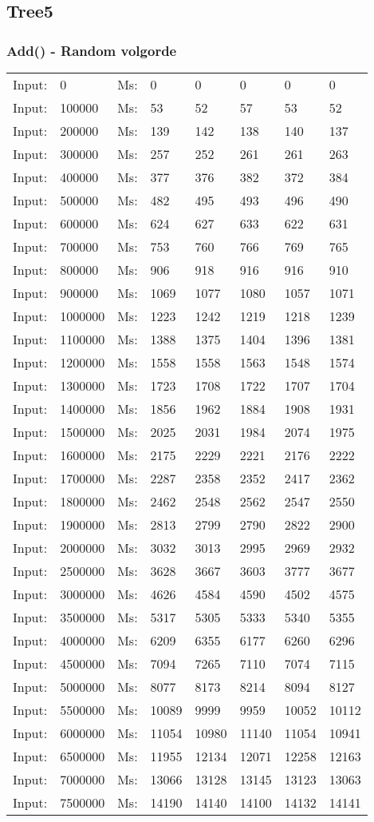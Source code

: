 \documentclass[11pt,a4paper]{report}
\begin{document}
\begin{tiny}
\subsection*{Tree5}
\subsubsection*{Add() - Random volgorde}
\begin{tabular}{l l ||l  l  l  l  l  l}
Input:&0&Ms:&0&0&0&0&0\\
Input:&100000&Ms:&53&52&57&53&52\\
Input:&200000&Ms:&139&142&138&140&137\\
Input:&300000&Ms:&257&252&261&261&263\\
Input:&400000&Ms:&377&376&382&372&384\\
Input:&500000&Ms:&482&495&493&496&490\\
Input:&600000&Ms:&624&627&633&622&631\\
Input:&700000&Ms:&753&760&766&769&765\\
Input:&800000&Ms:&906&918&916&916&910\\
Input:&900000&Ms:&1069&1077&1080&1057&1071\\
Input:&1000000&Ms:&1223&1242&1219&1218&1239\\
Input:&1100000&Ms:&1388&1375&1404&1396&1381\\
Input:&1200000&Ms:&1558&1558&1563&1548&1574\\
Input:&1300000&Ms:&1723&1708&1722&1707&1704\\
Input:&1400000&Ms:&1856&1962&1884&1908&1931\\
Input:&1500000&Ms:&2025&2031&1984&2074&1975\\
Input:&1600000&Ms:&2175&2229&2221&2176&2222\\
Input:&1700000&Ms:&2287&2358&2352&2417&2362\\
Input:&1800000&Ms:&2462&2548&2562&2547&2550\\
Input:&1900000&Ms:&2813&2799&2790&2822&2900\\
Input:&2000000&Ms:&3032&3013&2995&2969&2932\\
Input:&2500000&Ms:&3628&3667&3603&3777&3677\\
Input:&3000000&Ms:&4626&4584&4590&4502&4575\\
Input:&3500000&Ms:&5317&5305&5333&5340&5355\\
Input:&4000000&Ms:&6209&6355&6177&6260&6296\\
Input:&4500000&Ms:&7094&7265&7110&7074&7115\\
Input:&5000000&Ms:&8077&8173&8214&8094&8127\\
Input:&5500000&Ms:&10089&9999&9959&10052&10112\\
Input:&6000000&Ms:&11054&10980&11140&11054&10941\\
Input:&6500000&Ms:&11955&12134&12071&12258&12163\\
Input:&7000000&Ms:&13066&13128&13145&13123&13063\\
Input:&7500000&Ms:&14190&14140&14100&14132&14141\\
\end{tabular}
\\

\end{tiny}
\end{document}
